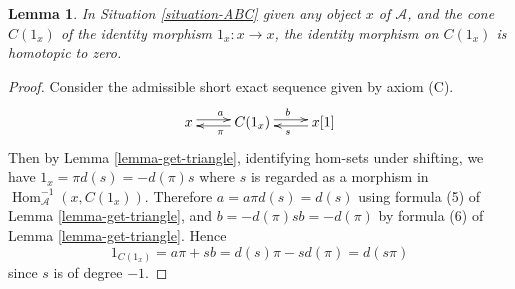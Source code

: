 \documentclass{stacks-project}
\theoremstyle{plain}
\newtheorem{lemma}[subsection]{Lemma}
\theoremstyle{definition}
\theoremstyle{remark}
\numberwithin{equation}{subsection}
\def\Hom{\mathop{\mathrm{Hom}}\nolimits}
\begin{document}
\begin{lemma}
\label{lemma-id-cone-null}
In Situation \ref{situation-ABC}
given any object $x$ of $\mathcal{A}$, and the cone $C(1_x)$ of the
identity morphism $1_x : x \to x$, the identity morphism on
$C(1_x)$ is homotopic to zero.
\end{lemma}

\begin{proof}
Consider the admissible short exact sequence given by axiom (C).
$$
\xymatrix{
x \ar@<0.5ex>[r]^a  &
C(1_x) \ar@<0.5ex>[l]^{\pi} \ar@<0.5ex>[r]^b &
x[1]\ar@<0.5ex>[l]^s
}
$$
Then by Lemma \ref{lemma-get-triangle}, identifying hom-sets under
shifting, we have $1_x=\pi d(s)=-d(\pi)s$ where $s$ is regarded as
a morphism in $\Hom_{\mathcal{A}}^{-1}(x,C(1_x))$. Therefore
$a=a\pi d(s)=d(s)$ using formula (5) of Lemma \ref{lemma-get-triangle},
and $b=-d(\pi)sb=-d(\pi)$ by formula (6) of Lemma \ref{lemma-get-triangle}.
Hence
$$
1_{C(1_x)} = a\pi + sb = d(s)\pi - sd(\pi) = d(s\pi)
$$
since $s$ is of degree $-1$.
\end{proof}
\end{document}
